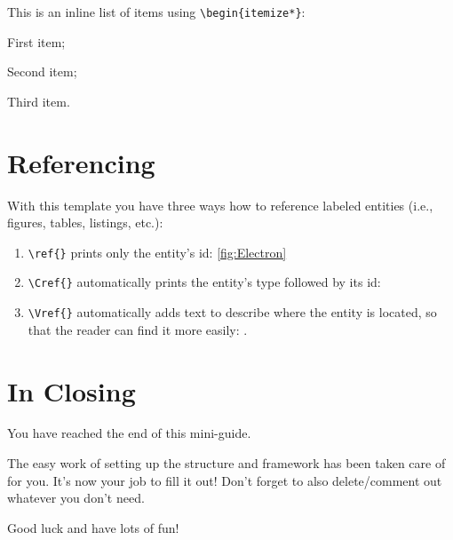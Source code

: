 This is an inline list of items using \verb|\begin{itemize*}|:
\begin{itemize*}
    \item First item;
    \item Second item;
    \item Third item.
\end{itemize*}


\section{Referencing}
With this template you have three ways how to reference labeled entities (i.e., figures, tables, listings, etc.):
\begin{enumerate}
    \item \verb|\ref{}| prints only the entity's id: \ref{fig:Electron}
    \item \verb|\Cref{}| automatically prints the entity's type followed by its id: 
    \item \verb|\Vref{}| automatically adds text to describe where the entity is located, so that the reader can find it more easily: .
\end{enumerate}


\section{In Closing}
You have reached the end of this mini-guide. 

The easy work of setting up the structure and framework has been taken care of for you. 
It's now your job to fill it out!
Don't forget to also delete/comment out whatever you don't need.

Good luck and have lots of fun!
